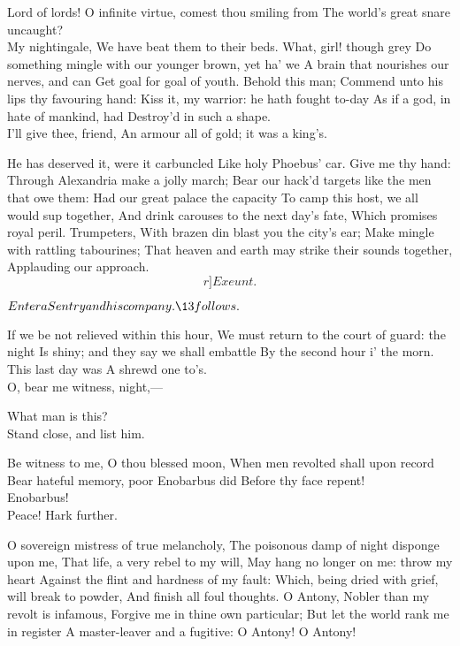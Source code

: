 \documentclass{book}
\begin{document}
\2	Lord of lords!
	O infinite virtue, comest thou smiling from
	The world's great snare uncaught? \\

\1	My nightingale,
	We have beat them to their beds. What, girl! though grey
	Do something mingle with our younger brown, yet ha' we
	A brain that nourishes our nerves, and can
	Get goal for goal of youth. Behold this man;
	Commend unto his lips thy favouring hand:
	Kiss it, my warrior: he hath fought to-day
	As if a god, in hate of mankind, had
	Destroy'd in such a shape. \\

\2	I'll give thee, friend,
	An armour all of gold; it was a king's.

\1	He has deserved it, were it carbuncled
	Like holy Phoebus' car. Give me thy hand:
	Through Alexandria make a jolly march;
	Bear our hack'd targets like the men that owe them:
	Had our great palace the capacity
	To camp this host, we all would sup together,
	And drink carouses to the next day's fate,
	Which promises royal peril. Trumpeters,
	With brazen din blast you the city's ear;
	Make mingle with rattling tabourines;
	That heaven and earth may strike their sounds together,
	Applauding our approach. 	\[r]Exeunt.\]




	\(Enter a Sentry and his company. \13 follows.\)

	If we be not relieved within this hour,
	We must return to the court of guard: the night
	Is shiny; and they say we shall embattle
	By the second hour i' the morn. \\

	This last day was
	A shrewd one to's. \\

	                  O, bear me witness, night,---

	What man is this? \\

	                  Stand close, and list him.

	Be witness to me, O thou blessed moon,
	When men revolted shall upon record
	Bear hateful memory, poor Enobarbus did
	Before thy face repent! \\

	Enobarbus! \\

	Peace!
	Hark further.

	O sovereign mistress of true melancholy,
	The poisonous damp of night disponge upon me,
	That life, a very rebel to my will,
	May hang no longer on me: throw my heart
	Against the flint and hardness of my fault:
	Which, being dried with grief, will break to powder,
	And finish all foul thoughts. O Antony,
	Nobler than my revolt is infamous,
	Forgive me in thine own particular;
	But let the world rank me in register
	A master-leaver and a fugitive:
	O Antony! O Antony! \\
\end{document}
